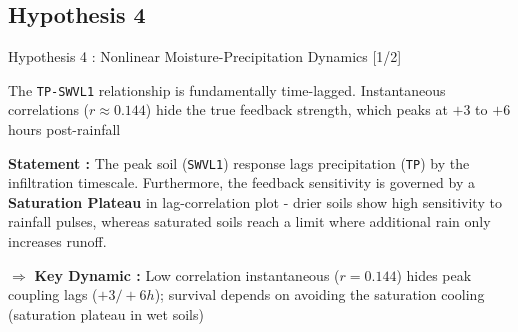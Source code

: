 \documentclass[8pt, aspectratio=169]{beamer}
\begin{document}
\subsection{Hypothesis 4}
\begin{frame}{Hypothesis 4 : Nonlinear Moisture-Precipitation Dynamics [1/2]}
    \vspace{-0.1cm}
    \begin{block}{The \texttt{TP-SWVL1} relationship is fundamentally time-lagged. Instantaneous correlations ($r \approx 0.144$) hide the true feedback strength, which peaks at $+3$ to $+6$ hours post-rainfall}\end{block}

    \vspace{0.15cm}
    \footnotesize
    \textbf{Statement :} The peak soil (\texttt{SWVL1}) response lags precipitation (\texttt{TP}) by the infiltration timescale. Furthermore, the feedback sensitivity is governed by a \textbf{Saturation Plateau} in lag-correlation plot - drier soils show high sensitivity to rainfall pulses, whereas saturated soils reach a limit where additional rain only increases runoff.

    \vspace{0.2cm}
    \footnotesize
    $\Rightarrow$ \textbf{Key Dynamic :} Low correlation instantaneous ($r=0.144$) hides peak coupling lags ($+3/+6h$); survival depends on avoiding the saturation cooling (saturation plateau in wet soils)


\end{frame}
\end{document}
